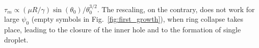 \documentclass[twoside,twocolumn,9pt]{article}
\begin{document}
$\tau_m \propto (\mu R/\gamma) \sin(\theta_0)/\theta_0^{3/2}$. 
The rescaling, on the contrary, does not work for large $\psi_0$ (empty symbols in Fig.~\ref{fig:first_growth}), when ring collapse takes place, leading to the closure of the inner hole 
and to the formation of single droplet.
\end{document}
